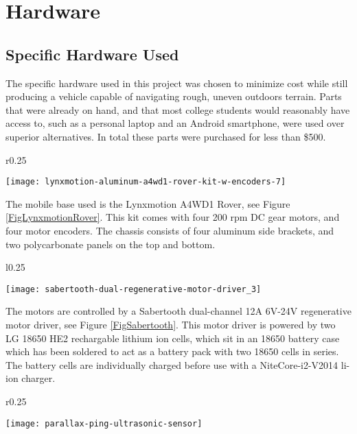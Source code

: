 \chapter{Hardware}

\section{Specific Hardware Used}
The specific hardware used in this project was chosen to minimize cost while still producing a vehicle capable of navigating rough, uneven outdoors terrain. Parts that were already on hand, and that most college students would reasonably have access to, such as a personal laptop and an Android smartphone, were used over superior alternatives. In total these parts were purchased for less than \$500.
\begin{wrapfigure}{r}{0.25\textwidth} %
	\caption{Lynxmotion 4WD Rover \cite{fig_lynxmotion_rover}}
	\centering
	\texttt{[image: lynxmotion-aluminum-a4wd1-rover-kit-w-encoders-7]}
	\label{FigLynxmotionRover}
\end{wrapfigure}

The mobile base used is the Lynxmotion A4WD1 Rover, see Figure \ref{FigLynxmotionRover}. This kit comes with four 200 rpm DC gear motors, and four motor encoders. The chassis consists of four aluminum side brackets, and two polycarbonate panels on the top and bottom.

\begin{wrapfigure}{l}{0.25\textwidth}
	\caption{Sabertooth 2x12 \cite{fig_sabertooth}}
	\centering
	\texttt{[image: sabertooth-dual-regenerative-motor-driver\_3]}
	\label{FigSabertooth}
\end{wrapfigure}

The motors are controlled by a Sabertooth dual-channel 12A 6V-24V regenerative motor driver, see Figure \ref{FigSabertooth}. This motor driver is powered by two LG 18650 HE2 rechargable lithium ion cells, which sit in an 18650 battery case which has been soldered to act as a battery pack with two 18650 cells in series. The battery cells are individually charged before use with a NiteCore-i2-V2014 li-ion charger.

\begin{wrapfigure}{r}{0.25\textwidth} %
	\caption{PING))) Ultrasonic Sensor \cite{fig_ping}}
	\centering
	\texttt{[image: parallax-ping-ultrasonic-sensor]}
	\label{FigPing}
\end{wrapfigure}

